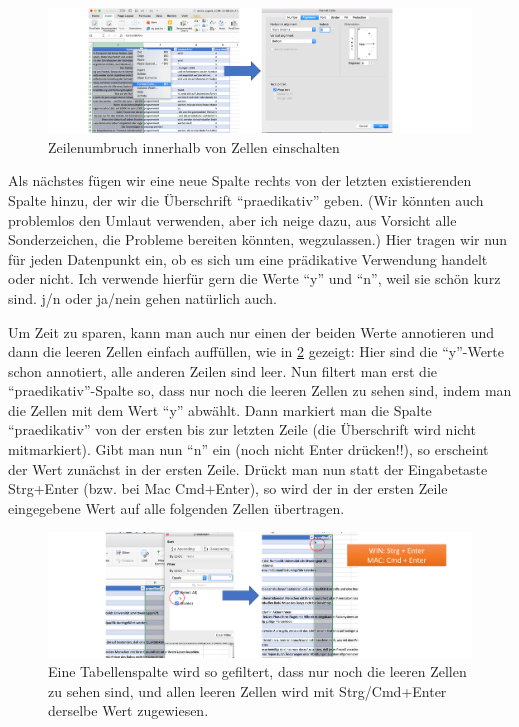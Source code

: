 \documentclass[]{article}
\begin{document}
\begin{figure}
\includegraphics[width=6.66in]{docs/fig/excellinewrap} \caption{Zeilenumbruch innerhalb von Zellen einschalten}\label{fig:excelwrap}
\end{figure}

Als nächstes fügen wir eine neue Spalte rechts von der letzten
existierenden Spalte hinzu, der wir die Überschrift ``praedikativ''
geben. (Wir könnten auch problemlos den Umlaut verwenden, aber ich neige
dazu, aus Vorsicht alle Sonderzeichen, die Probleme bereiten könnten,
wegzulassen.) Hier tragen wir nun für jeden Datenpunkt ein, ob es sich
um eine prädikative Verwendung handelt oder nicht. Ich verwende hierfür
gern die Werte ``y'' und ``n'', weil sie schön kurz sind. j/n oder
ja/nein gehen natürlich auch.

Um Zeit zu sparen, kann man auch nur einen der beiden Werte annotieren
und dann die leeren Zellen einfach auffüllen, wie in
\ref{fig:excelbulkchange} gezeigt: Hier sind die ``y''-Werte schon
annotiert, alle anderen Zeilen sind leer. Nun filtert man erst die
``praedikativ''-Spalte so, dass nur noch die leeren Zellen zu sehen
sind, indem man die Zellen mit dem Wert ``y'' abwählt. Dann markiert man
die Spalte ``praedikativ'' von der ersten bis zur letzten Zeile (die
Überschrift wird nicht mitmarkiert). Gibt man nun ``n'' ein (noch nicht
Enter drücken!!), so erscheint der Wert zunächst in der ersten Zeile.
Drückt man nun statt der Eingabetaste Strg+Enter (bzw. bei Mac
Cmd+Enter), so wird der in der ersten Zeile eingegebene Wert auf alle
folgenden Zellen übertragen.

\begin{figure}
\includegraphics[width=6.66in]{docs/fig/excel_bulk_change} \caption{Eine Tabellenspalte wird so gefiltert, dass nur noch die leeren Zellen zu sehen sind, und allen leeren Zellen wird mit Strg/Cmd+Enter derselbe Wert zugewiesen.}\label{fig:excelbulkchange}
\end{figure}
\end{document}
